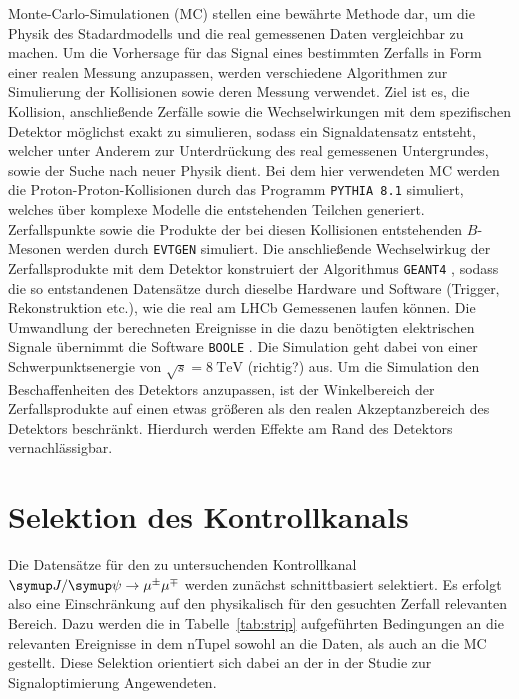Monte-Carlo-Simulationen (MC) stellen eine bewährte Methode dar, um die Physik des Stadardmodells und die real gemessenen Daten vergleichbar zu machen. Um die Vorhersage für das Signal eines bestimmten Zerfalls in Form einer realen Messung anzupassen, werden verschiedene Algorithmen zur Simulierung der Kollisionen sowie deren Messung verwendet. Ziel ist es, die Kollision, anschließende Zerfälle sowie die Wechselwirkungen mit dem spezifischen Detektor möglichst exakt zu simulieren, sodass ein Signaldatensatz entsteht, welcher unter Anderem zur Unterdrückung des real gemessenen Untergrundes, sowie der Suche nach neuer Physik dient. Bei dem hier verwendeten MC werden die Proton-Proton-Kollisionen durch das Programm \texttt{PYTHIA 8.1} \cite{pythia} simuliert, welches über komplexe Modelle die entstehenden Teilchen generiert. Zerfallspunkte sowie die Produkte der bei diesen Kollisionen entstehenden $B$-Mesonen werden durch \texttt{EVTGEN} \cite{evtgen} simuliert. Die anschließende Wechselwirkug der Zerfallsprodukte mit dem Detektor konstruiert der Algorithmus \texttt{GEANT4}  \cite{geant4}, sodass die so entstandenen Datensätze durch dieselbe Hardware und Software (Trigger, Rekonstruktion etc.), wie die real am LHCb Gemessenen laufen können. Die Umwandlung der berechneten Ereignisse in die dazu benötigten elektrischen Signale übernimmt die Software \texttt{BOOLE} \cite{boole}. Die Simulation geht dabei von einer Schwerpunktsenergie von $\sqrt{s}=\SI{8}{\tera\electronvolt}$ (richtig?) aus. Um die Simulation den Beschaffenheiten des Detektors anzupassen, ist der Winkelbereich der Zerfallsprodukte auf einen etwas größeren als den realen Akzeptanzbereich des Detektors beschränkt. Hierdurch werden Effekte am Rand des Detektors vernachlässigbar.

\section{Selektion des Kontrollkanals}
%
Die Datensätze für den zu untersuchenden Kontrollkanal $\kontroll$ werden zunächst schnittbasiert selektiert. Es erfolgt also eine Einschränkung auf den physikalisch für den gesuchten Zerfall relevanten Bereich. Dazu werden die in Tabelle~\ref{tab:strip} aufgeführten Bedingungen an die relevanten Ereignisse in dem nTupel sowohl an die Daten, als auch an die MC gestellt. Diese Selektion orientiert sich dabei an der in der Studie zur Signaloptimierung \cite{ba-maik} Angewendeten.

